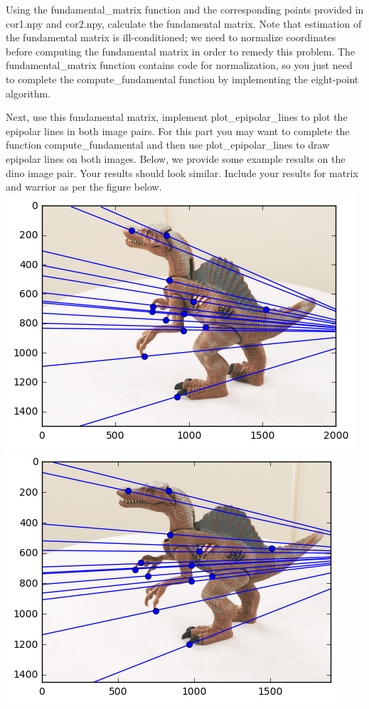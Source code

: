 \documentclass[11pt]{article}
\makeatletter
\def\maxwidth{\ifdim\Gin@nat@width>\linewidth\linewidth
    \else\Gin@nat@width\fi}
\let\Oldincludegraphics\includegraphics
\renewcommand{\includegraphics}[1]{\Oldincludegraphics[width=.8\maxwidth]{#1}}
\makeatother
\begin{document}
Using the fundamental\_matrix function and the corresponding points
provided in cor1.npy and cor2.npy, calculate the fundamental matrix.
Note that estimation of the fundamental matrix is ill-conditioned; we
need to normalize coordinates before computing the fundamental matrix in
order to remedy this problem. The fundamental\_matrix function contains
code for normalization, so you just need to complete the
compute\_fundamental function by implementing the eight-point algorithm.

Next, use this fundamental matrix, implement plot\_epipolar\_lines to
plot the epipolar lines in both image pairs. For this part you may want
to complete the function compute\_fundamental and then use
plot\_epipolar\_lines to draw epipolar lines on both images. Below, we
provide some example results on the dino image pair. Your results should
look similar. Include your results for matrix and warrior as per the
figure below. \includegraphics{fig/dinoEpi1.png}
\includegraphics{fig/dinoEpi2.png}
\end{document}
